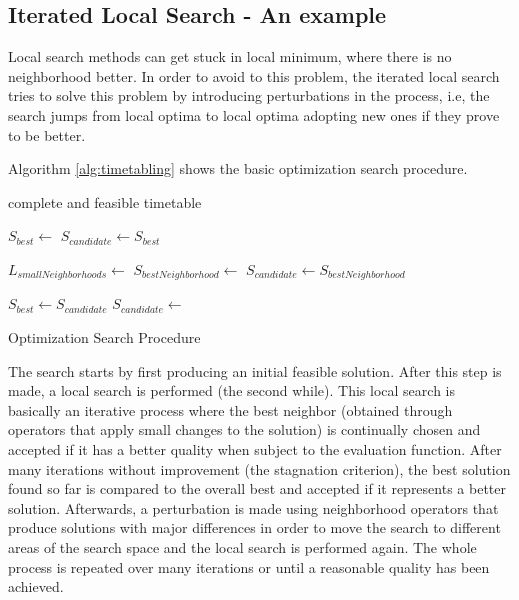 \subsection{Iterated Local Search - An example}

Local search methods can get stuck in local minimum, where there is no neighborhood better. In order to avoid to this problem, the iterated local search tries to solve this problem by introducing perturbations in the process, i.e, the search jumps from local optima to local optima adopting new ones if they prove to be better.

Algorithm  \ref{alg:timetabling} shows the basic optimization search procedure.

\begin{algorithm}[htpb]
\begin{algorithmic}
\Require complete and feasible timetable 

	\State $S_{best}\gets $  
	\State $S_{candidate}\gets S_{best} $
	
		\State $L_{smallNeighborhoods}\gets $  
		\State $S_{bestNeighborhood}\gets $  
			\State $S_{candidate}\gets S_{bestNeighborhood}$
		\EndIf
	\EndWhile
	
		\State $S_{best}\gets S_{candidate}$
	\EndIf
	\State $S_{candidate}\gets $  
	
\EndWhile
\caption{Optimization Search Procedure}\label{alg:timetabling}
\end{algorithmic}
\end{algorithm}

The search starts by first producing an initial feasible solution. After this step is made, a local search is performed (the second while). This local search is basically an iterative process where the best neighbor (obtained through operators that apply small changes to the solution) is continually chosen and accepted if it has a better quality when subject to the evaluation function. After many iterations without improvement (the stagnation criterion), the best solution found so far is compared to the overall best and accepted if it represents a better solution. Afterwards, a perturbation is made using neighborhood operators that produce solutions with major differences in order to move the search to different areas of the search space and the local search is performed again. The whole process is repeated over many iterations or until a reasonable quality has been achieved.
